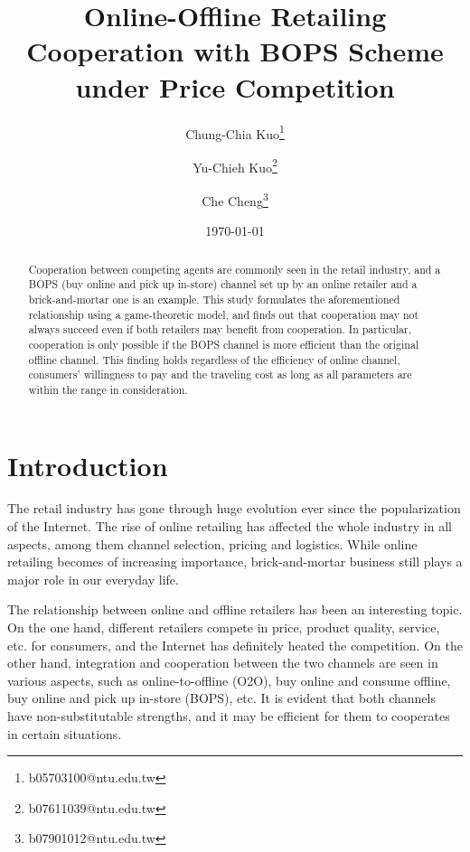 \documentclass[a4paper]{article}
\theoremstyle{definition}
\theoremstyle{plain}
\theoremstyle{remark}
\begin{document}
\title{Online-Offline Retailing Cooperation with BOPS Scheme under Price Competition}
\date{\today}
\author[1]{Chung-Chia Kuo\thanks{b05703100@ntu.edu.tw}}
\author[1]{Yu-Chieh Kuo\thanks{b07611039@ntu.edu.tw}}
\author[2]{Che Cheng\thanks{b07901012@ntu.edu.tw}}
\maketitle
\begin{abstract}
    Cooperation between competing agents are commonly seen in the retail industry,
    and a BOPS (buy online and pick up in-store) channel set up by an online retailer and a brick-and-mortar one is an example.
    This study formulates the aforementioned relationship using a game-theoretic model,
    and finds out that cooperation may not always succeed even  if both retailers may benefit from cooperation.
    In particular,
    cooperation is only possible if the BOPS channel is more efficient than the original offline channel.
    This finding holds regardless of the efficiency of online channel,
    consumers' willingness to pay and the traveling cost as long as all parameters are within the range in consideration.
\end{abstract}

\section{Introduction}
The retail industry has gone through huge evolution ever since the popularization of the Internet.
The rise of online retailing has affected the whole industry in all aspects,
among them channel selection, pricing and logistics.
While online retailing becomes of increasing importance,
brick-and-mortar business still plays a major role in our everyday life.

The relationship between online and offline retailers has been an interesting topic.
On the one hand,
different retailers compete in price, product quality, service, etc. for consumers,
and the Internet has definitely heated the competition.
On the other hand,
integration and cooperation between the two channels are seen in various aspects,
such as online-to-offline (O2O),
buy online and consume offline,
buy online and pick up in-store (BOPS), etc.
It is evident that both channels have non-substitutable strengths,
and it may be efficient for them to cooperates in certain situations.
\end{document}
